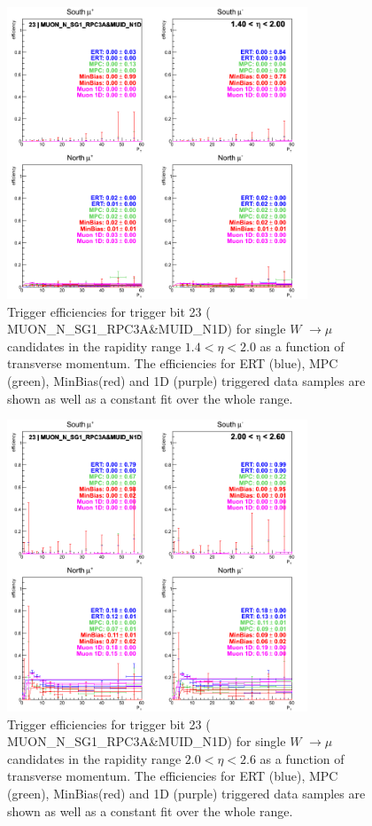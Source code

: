 \begin{figure}[ht]
\begin{center}
\includegraphics[width=0.8\textwidth]{./figures/run13_trigeffipt_eta1_trig23_lin.png}
\caption{\label{fig:run13_trigeffipt_eta1_nper0_trig23_lin} Trigger efficiencies for trigger bit 23 ( MUON\_N\_SG1\_RPC3A\&MUID\_N1D) for single $W$ $\rightarrow \mu$ candidates in the rapidity range $ 1.4 < \eta < 2.0$ as a function of transverse momentum. The efficiencies for ERT (blue), MPC (green), MinBias(red) and 1D (purple) triggered data samples are shown as well as a constant fit over the whole range.}
\end{center}
\end{figure}
\begin{figure}[ht]
\begin{center}
\includegraphics[width=0.8\textwidth]{./figures/run13_trigeffipt_eta2_trig23_lin.png}
\caption{\label{fig:run13_trigeffipt_eta2_nper0_trig23_lin} Trigger efficiencies for trigger bit 23 ( MUON\_N\_SG1\_RPC3A\&MUID\_N1D) for single $W$ $\rightarrow \mu$ candidates in the rapidity range $ 2.0 < \eta < 2.6$ as a function of transverse momentum. The efficiencies for ERT (blue), MPC (green), MinBias(red) and 1D (purple) triggered data samples are shown as well as a constant fit over the whole range.}
\end{center}
\end{figure}
